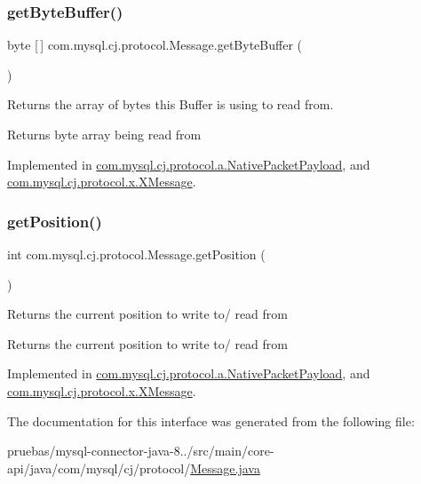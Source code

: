 \subsubsection{\texorpdfstring{get\+Byte\+Buffer()}{getByteBuffer()}}
{\footnotesize\ttfamily byte \mbox{[}$\,$\mbox{]} com.\+mysql.\+cj.\+protocol.\+Message.\+get\+Byte\+Buffer (\begin{DoxyParamCaption}{ }\end{DoxyParamCaption})}

Returns the array of bytes this Buffer is using to read from.

\begin{DoxyReturn}{Returns}
byte array being read from 
\end{DoxyReturn}


Implemented in \mbox{\hyperlink{classcom_1_1mysql_1_1cj_1_1protocol_1_1a_1_1_native_packet_payload_a9aad2cb05c0a41d027987a601991e1a0}{com.\+mysql.\+cj.\+protocol.\+a.\+Native\+Packet\+Payload}}, and \mbox{\hyperlink{classcom_1_1mysql_1_1cj_1_1protocol_1_1x_1_1_x_message_ae2dfe8871615d85dbd7a8a7320a5025a}{com.\+mysql.\+cj.\+protocol.\+x.\+X\+Message}}.

\mbox{\label{interfacecom_1_1mysql_1_1cj_1_1protocol_1_1_message_a87a2626f6e5aceccffe224bcaf0e126b}} 
\subsubsection{\texorpdfstring{get\+Position()}{getPosition()}}
{\footnotesize\ttfamily int com.\+mysql.\+cj.\+protocol.\+Message.\+get\+Position (\begin{DoxyParamCaption}{ }\end{DoxyParamCaption})}

Returns the current position to write to/ read from

\begin{DoxyReturn}{Returns}
the current position to write to/ read from 
\end{DoxyReturn}


Implemented in \mbox{\hyperlink{classcom_1_1mysql_1_1cj_1_1protocol_1_1a_1_1_native_packet_payload_a89ff1dc3fa0998b1362a9fc2351d6797}{com.\+mysql.\+cj.\+protocol.\+a.\+Native\+Packet\+Payload}}, and \mbox{\hyperlink{classcom_1_1mysql_1_1cj_1_1protocol_1_1x_1_1_x_message_a5aa5c54128a10a7280a2113c4e24aeb9}{com.\+mysql.\+cj.\+protocol.\+x.\+X\+Message}}.



The documentation for this interface was generated from the following file\+:\begin{DoxyCompactItemize}
\item 
pruebas/mysql-\/connector-\/java-\/8../src/main/core-\/api/java/com/mysql/cj/protocol/\mbox{\hyperlink{_message_8java}{Message.\+java}}\end{DoxyCompactItemize}
